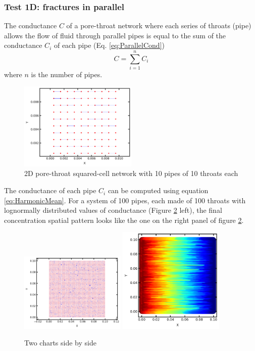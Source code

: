 \documentclass{article}
\begin{document}
\FloatBarrier  %
\subsubsection{Test 1D: fractures in parallel}
The conductance $C$ of a pore-throat network where each series of throats (pipe) allows the flow of fluid through parallel pipes is equal to the sum of the conductance $C_i$ of each pipe (Eq. \ref{eq:ParallelCond})
\begin{equation}
    C = \sum_{i=1}^{n} C_i
    \label{eq:ParallelCond}
\end{equation}
where $n$ is the number of pipes.
\begin{figure}[htbp]
    \centering
    \includegraphics[width=0.5\textwidth]{images/fromOpenPNM/parallel2Dpn10x10.png}
    \caption{2D pore-throat squared-cell network with 10 pipes of 10 throats each}
    \label{fig:NetworkParallel}
\end{figure}
The conductance of each pipe $C_i$ can be computed using equation \ref{eq:HarmonicMean}.
For a system of 100 pipes, each made of 100 throats with lognormally distributed values of conductance (Figure \ref{fig:Parallel100x100} left), the final concentration spatial pattern looks like the one on the right panel of figure \ref{fig:Parallel100x100}.
\begin{figure}[htbp!]
    \centering
    \includegraphics[width=0.45\textwidth]{images/fromOpenPNM/parallelGrid100x100.png}
    \hspace{0.05\textwidth} %
    \includegraphics[width=0.45\textwidth]{images/fromOpenPNM/parallelConc100x100.png}
    \caption{Two charts side by side}
    \label{fig:Parallel100x100}
\end{figure}
\end{document}
